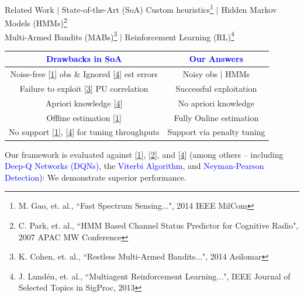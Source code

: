 \documentclass{beamer}
\begin{document}
\begin{frame}{Related Work $|$ State-of-the-Art (SoA)}
Custom heuristics\footnote{\label{F4}\tiny{M. Gao, et. al., ``Fast Spectrum Sensing...", 2014 IEEE MilCom}} $|$ Hidden Markov Models (HMMs)\footnote{\label{F6}\tiny{C. Park, et. al., ``HMM Based Channel Status Predictor for Cognitive Radio", 2007 APAC MW Conference}}\\Multi-Armed Bandits (MABs)\footnote{\label{F5}\tiny{K. Cohen, et. al., ``Restless Multi-Armed Bandits...", 2014 Asilomar}} $|$ Reinforcement Learning (RL)\footnote{\label{F3}\tiny{J. Lund\'{e}n, et. al., ``Multiagent Reinforcement Learning...", IEEE Journal of Selected Topics in SigProc, 2013}}
\footnotesize{
\begin{center}
    \begin{tabular}{ || c | c || }
        \hline
        \textcolor{blue}{Drawbacks in SoA} & \textcolor{blue}{Our Answers}\\
    	\hline\hline
    	\textcolor{red!75!blue}{Noise-free} [\ref{F4}] obs \& \textcolor{red!75!blue}{Ignored} [\ref{F3}] est errors & \textcolor{green!65!blue}{Noisy} obs $|$ \textcolor{green!65!blue}{HMMs}\\
    	\hline
    	\textcolor{red!75!blue}{Failure to exploit} [\ref{F5}] PU correlation & \textcolor{green!65!blue}{Successful exploitation}\\
    	\hline
    	\textcolor{red!75!blue}{Apriori knowledge} [\ref{F3}] & \textcolor{green!65!blue}{No apriori knowledge}\\
    	\hline
    	\textcolor{red!75!blue}{Offline estimation} [\ref{F4}] & \textcolor{green!65!blue}{Fully Online estimation}\\
    	\hline
    	\textcolor{red!75!blue}{No support} [\ref{F4}], [\ref{F3}] for tuning throughputs & \textcolor{green!65!blue}{Support} via penalty tuning\\
    	\hline
    \end{tabular}
\end{center}}
Our framework is evaluated against [\ref{F4}], [\ref{F6}], and [\ref{F3}] (among others -- including \textcolor{blue}{Deep-Q Networks (DQNs)}, the \textcolor{blue}{Viterbi Algorithm}, and \textcolor{blue}{Neyman-Pearson Detection}): \textcolor{green!65!blue}{We demonstrate superior performance}.
\end{frame}
\end{document}
